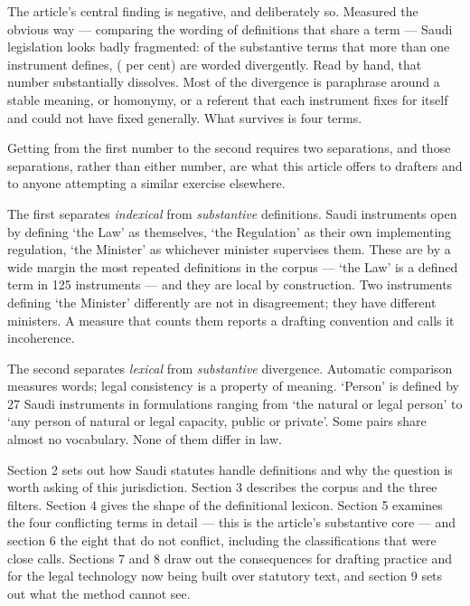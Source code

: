 \documentclass[11pt]{article}
\begin{document}
The article's central finding is negative, and deliberately so. Measured the
obvious way --- comparing the wording of definitions that share a term ---
Saudi legislation looks badly fragmented: of the \nSharedSubstantive{} substantive terms that
more than one instrument defines, \nDivergent{} (\nDivergentShare{} per cent) are worded divergently.
Read by hand, that number substantially dissolves. Most of the divergence is
paraphrase around a stable meaning, or homonymy, or a referent that each
instrument fixes for itself and could not have fixed generally. What survives
is four terms.

Getting from the first number to the second requires two separations, and
those separations, rather than either number, are what this article offers to
drafters and to anyone attempting a similar exercise elsewhere.

The first separates \emph{indexical} from \emph{substantive} definitions.
Saudi instruments open by defining `the Law' as themselves, `the Regulation'
as their own implementing regulation, `the Minister' as whichever minister
supervises them. These are by a wide margin the most repeated definitions in
the corpus --- `the Law' is a defined term in 125 instruments --- and they
are local by construction. Two instruments defining `the Minister'
differently are not in disagreement; they have different ministers. A measure
that counts them reports a drafting convention and calls it incoherence.

The second separates \emph{lexical} from \emph{substantive} divergence.
Automatic comparison measures words; legal consistency is a property of
meaning. `Person' is defined by 27 Saudi instruments in formulations ranging
from `the natural or legal person' to `any person of natural or legal
capacity, public or private'. Some pairs share almost no vocabulary. None of
them differ in law.

Section 2 sets out how Saudi statutes handle definitions and why the question
is worth asking of this jurisdiction. Section 3 describes the corpus and the
three filters. Section 4 gives the shape of the definitional lexicon. Section
5 examines the four conflicting terms in detail --- this is the article's
substantive core --- and section 6 the eight that do not conflict, including
the classifications that were close calls. Sections 7 and 8 draw out the
consequences for drafting practice and for the legal technology now being
built over statutory text, and section 9 sets out what the method cannot see.
\end{document}
